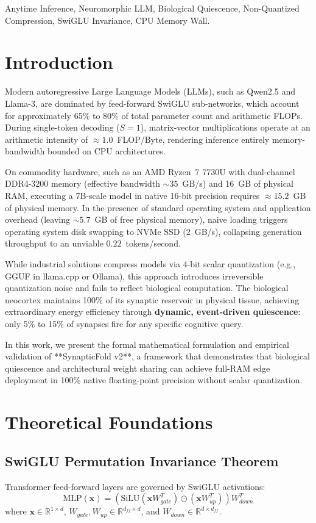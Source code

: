 \documentclass[10pt,journal,compsoc]{IEEEtran}
\theoremstyle{definition}
\begin{document}
\begin{IEEEkeywords}
Anytime Inference, Neuromorphic LLM, Biological Quiescence, Non-Quantized Compression, SwiGLU Invariance, CPU Memory Wall.
\end{IEEEkeywords}

\section{Introduction}
Modern autoregressive Large Language Models (LLMs), such as Qwen2.5 and Llama-3, are dominated by feed-forward SwiGLU sub-networks, which account for approximately 65\% to 80\% of total parameter count and arithmetic FLOPs. During single-token decoding ($S=1$), matrix-vector multiplications operate at an arithmetic intensity of $\approx 1.0$~FLOP/Byte, rendering inference entirely memory-bandwidth bounded on CPU architectures.

On commodity hardware, such as an AMD Ryzen~7 7730U with dual-channel DDR4-3200 memory (effective bandwidth $\sim 35$~GB/s) and 16~GB of physical RAM, executing a 7B-scale model in native 16-bit precision requires $\approx 15.2$~GB of physical memory. In the presence of standard operating system and application overhead (leaving $\sim 5.7$~GB of free physical memory), naive loading triggers operating system disk swapping to NVMe SSD ($2$~GB/s), collapsing generation throughput to an unviable $0.22$~tokens/second.

While industrial solutions compress models via 4-bit scalar quantization (e.g., GGUF in llama.cpp or Ollama), this approach introduces irreversible quantization noise and fails to reflect biological computation. The biological neocortex maintains 100\% of its synaptic reservoir in physical tissue, achieving extraordinary energy efficiency through \textbf{dynamic, event-driven quiescence}: only 5\% to 15\% of synapses fire for any specific cognitive query.

In this work, we present the formal mathematical formulation and empirical validation of **SynapticFold v2**, a framework that demonstrates that biological quiescence and architectural weight sharing can achieve full-RAM edge deployment in 100\% native floating-point precision without scalar quantization.

\section{Theoretical Foundations}

\subsection{SwiGLU Permutation Invariance Theorem}
Transformer feed-forward layers are governed by SwiGLU activations:
\begin{equation}
\text{MLP}(\mathbf{x}) = \left( \text{SiLU}(\mathbf{x} W_{gate}^T) \odot (\mathbf{x} W_{up}^T) \right) W_{down}^T
\end{equation}
where $\mathbf{x} \in \mathbb{R}^{1 \times d}$, $W_{gate}, W_{up} \in \mathbb{R}^{d_{ff} \times d}$, and $W_{down} \in \mathbb{R}^{d \times d_{ff}}$.
\end{document}
